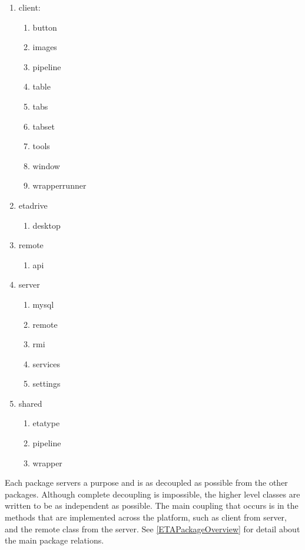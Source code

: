 \documentclass[12pt,a4paper]{article}
\begin{document}
\begin{enumerate}
    \item client:
    \begin{enumerate}
        \item button
        \item images
        \item pipeline
        \item table
        \item tabs
        \item tabset
        \item tools
        \item window
        \item wrapperrunner
    \end{enumerate}
    \item etadrive
    \begin{enumerate}
        \item desktop
    \end{enumerate}
    \item remote
    \begin{enumerate}
        \item api
    \end{enumerate}
    \item server
    \begin{enumerate}
        \item mysql
        \item remote
        \item rmi
        \item services
        \item settings
    \end{enumerate}
    \item shared
    \begin{enumerate}
        \item etatype
        \item pipeline
        \item wrapper
    \end{enumerate}
\end{enumerate}

Each package servers a purpose and is as decoupled as possible from the other packages. Although complete decoupling is impossible, the higher level classes are written to be as independent as possible. The main coupling that occurs is in the methods that are implemented across the platform, such as client from server, and the remote class from the server. See  \ref{ETAPackageOverview} for detail about the main package relations. 
\end{document}
